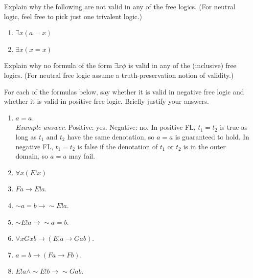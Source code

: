 \documentclass[../../../../include/open-logic-section]{subfiles}
\begin{document}


\begin{prob}[Semantics]
Explain why the following are not valid in any of the free logics.
(For neutral logic, feel free to pick just one trivalent logic.)
\begin{enumerate}
\item $\exists x(a=x)$
\item $\exists x(x=x)$
\end{enumerate}
\end{prob}

\begin{prob}[existence]
Explain why no formula of the form $\exists x\phi$ is valid in any
of the (inclusive) free logics. (For neutral free logic assume a truth-preservation
notion of validity.)
\end{prob}

\begin{prob}
For each of the formulas below, say whether it is valid in negative
free logic and whether it is valid in positive free logic. Briefly justify your answers.
\begin{enumerate}
\item $a=a$.\\
\emph{Example answer}. Positive: yes. Negative: no. In positive FL,
$t_{1}=t_{2}$ is true as long as $t_{1}$ and $t_{2}$ have the same
denotation, so $a=a$ is guaranteed to hold. In negative FL, $t_{1}=t_{2}$
is false if the denotation of $t_{1}$ or $t_{2}$ is in the outer
domain, so $a=a$ may fail. 
\item $\forall x(E!x)$
\item $Fa\rightarrow E!a$.
\item $\sim a=b\rightarrow\sim E!a$.
\item $\sim E!a\rightarrow\sim a=b$.
\item $\forall xGxb\rightarrow(E!a\rightarrow Gab)$.
\item $a=b\rightarrow(Fa\rightarrow Fb)$.
\item $E!a\land\sim E!b\rightarrow\sim Gab$.
\end{enumerate}
\end{prob}
\end{document}
